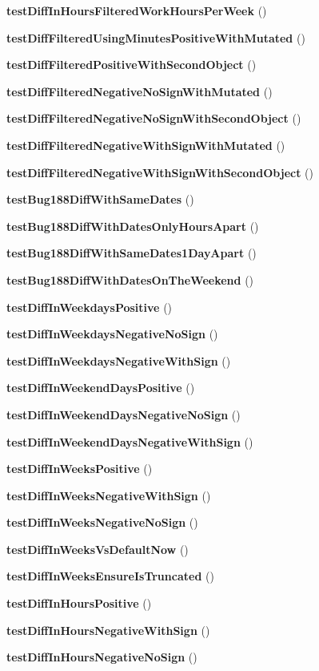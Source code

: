 \begin{DoxyCompactItemize}
\item 
{\bf test\+Diff\+In\+Hours\+Filtered\+Work\+Hours\+Per\+Week} ()
\item 
{\bf test\+Diff\+Filtered\+Using\+Minutes\+Positive\+With\+Mutated} ()
\item 
{\bf test\+Diff\+Filtered\+Positive\+With\+Second\+Object} ()
\item 
{\bf test\+Diff\+Filtered\+Negative\+No\+Sign\+With\+Mutated} ()
\item 
{\bf test\+Diff\+Filtered\+Negative\+No\+Sign\+With\+Second\+Object} ()
\item 
{\bf test\+Diff\+Filtered\+Negative\+With\+Sign\+With\+Mutated} ()
\item 
{\bf test\+Diff\+Filtered\+Negative\+With\+Sign\+With\+Second\+Object} ()
\item 
{\bf test\+Bug188\+Diff\+With\+Same\+Dates} ()
\item 
{\bf test\+Bug188\+Diff\+With\+Dates\+Only\+Hours\+Apart} ()
\item 
{\bf test\+Bug188\+Diff\+With\+Same\+Dates1\+Day\+Apart} ()
\item 
{\bf test\+Bug188\+Diff\+With\+Dates\+On\+The\+Weekend} ()
\item 
{\bf test\+Diff\+In\+Weekdays\+Positive} ()
\item 
{\bf test\+Diff\+In\+Weekdays\+Negative\+No\+Sign} ()
\item 
{\bf test\+Diff\+In\+Weekdays\+Negative\+With\+Sign} ()
\item 
{\bf test\+Diff\+In\+Weekend\+Days\+Positive} ()
\item 
{\bf test\+Diff\+In\+Weekend\+Days\+Negative\+No\+Sign} ()
\item 
{\bf test\+Diff\+In\+Weekend\+Days\+Negative\+With\+Sign} ()
\item 
{\bf test\+Diff\+In\+Weeks\+Positive} ()
\item 
{\bf test\+Diff\+In\+Weeks\+Negative\+With\+Sign} ()
\item 
{\bf test\+Diff\+In\+Weeks\+Negative\+No\+Sign} ()
\item 
{\bf test\+Diff\+In\+Weeks\+Vs\+Default\+Now} ()
\item 
{\bf test\+Diff\+In\+Weeks\+Ensure\+Is\+Truncated} ()
\item 
{\bf test\+Diff\+In\+Hours\+Positive} ()
\item 
{\bf test\+Diff\+In\+Hours\+Negative\+With\+Sign} ()
\item 
{\bf test\+Diff\+In\+Hours\+Negative\+No\+Sign} ()
\item 

\end{DoxyCompactItemize}

